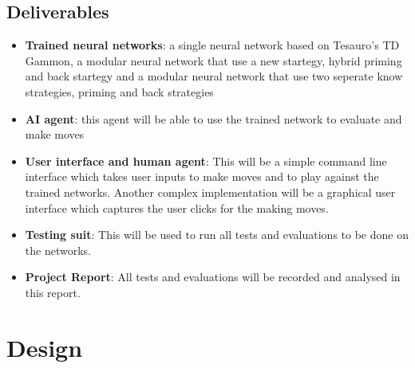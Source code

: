 \documentclass[12pt,a4paper]{article}
\begin{document}
\subsection{Deliverables}
\begin{itemize}
    \item \textbf{Trained neural networks}: a single neural network based on Tesauro's TD Gammon, a modular neural network that use a new startegy, hybrid priming and back startegy and a modular neural network that use two seperate know strategies, priming and back strategies
    \item \textbf{AI agent}: this agent will be able to use the trained network to evaluate and make moves
    \item \textbf{User interface and human agent}: This will be a simple command line interface which takes user inputs to make moves and to play against the trained networks. Another complex implementation will be a graphical user interface which captures the user clicks for the making moves.
    \item \textbf{Testing suit}: This will be used to run all tests and evaluations to be done on the networks.
    \item \textbf{Project Report}: All tests and evaluations will be recorded and analysed in this report.
\end{itemize}
\section{Design}
\end{document}
